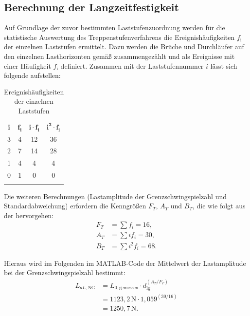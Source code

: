 	\subsection{Berechnung der Langzeitfestigkeit}
		Auf Grundlage der zuvor bestimmten Laststufenzuordnung werden für die statistische Auswertung des Treppenstufenverfahrens die Ereignishäufigkeiten $f_\text{i}$ der einzelnen Laststufen ermittelt.
	Dazu werden die Brüche und Durchläufer auf den einzelnen Lasthorizonten gemäß  zusammengezählt und als Ereignisse mit einer Häufigkeit $f_\text{i}$ definiert. Zusammen mit der Laststufennummer $i$ lässt sich folgende  aufstellen:
\begin{table}[H]
\centering
\caption{Ereignishäufigkeiten der einzelnen Laststufen}
\label{tab:Ereignishaeufigkeiten}

\begin{tabular}{!{\vrule width 1.2pt}c|c|c|c!{\vrule width 1.2pt}}

    $\boldsymbol{i}$ &
    $\boldsymbol{f_i}$ &
    $\boldsymbol{i \cdot f_i}$ &
    $\boldsymbol{i^2 \cdot f_i}$ \\


    3 & 4 & 12 & 36 \\
     & 7 & 14 & 28 \\
     & 4 & 4  & 4  \\
     & 1 & 0  & 0  \\

\end{tabular}

\end{table}

\clearpage
Die weiteren Berechnungen (Lastamplitude der Grenzschwingspielzahl und Standardabweichung) erfordern die Kenngrößen $F_T$, $A_T$ und $B_T$, die wie folgt aus der  hervorgehen:
\begin{align*}
F_T &= \sum f_i = 16,\\
A_T &= \sum i f_i = 30,\\
B_T &= \sum i^2 f_i = 68.
\end{align*}
	
	Hieraus wird im Folgenden im MATLAB-Code der Mittelwert der Lastamplitude bei der Grenzschwingspielzahl bestimmt:
\begin{align*}
L_{aL,\mathrm{NG}}
&=
L_{0,\mathrm{gemessen}} 
\cdot
d_{\lg}^{(A_T/F_T)}\\
&= 1123{,}2\,\mathrm{N}\cdot {1{,}059}^{(30/16)}\\
&= 1250{,}7\,\mathrm{N}.
\end{align*}
	
